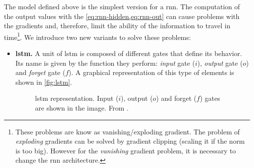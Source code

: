 The model defined above is the simplest version for a \gls{rnn}. The
computation of the output values with the \vref{eq:rnn-hidden,eq:rnn-out} can
cause problems with the gradients and, therefore, limit the ability of the
information to travel in time\footnote{These problems are know as
  vanishing/exploding gradient. The problem of \emph{exploding} gradients can
  be solved by gradient clipping (scaling it if the norm is too big). However
  for the \emph{vanishing} gradient problem, it is necessary to change the
  \gls{rnn} architecture.}. We introduce two new variants to solve these
problems:
\begin{itemize}
  \item \textbf{\gls{lstm}.} A unit of \gls{lstm} is composed of different
  gates that define its behavior. Its name is given by the function they
  perform: \emph{input} gate (\(i\)), \emph{output} gate (\(o\)) and
  \emph{forget} gate (\(f\)). A graphical representation of this type of
  elements is shown in \vref{fig:lstm}.
  \begin{figure}[ht]
    \centering
    
    \caption[ representation]{\acf{lstm}
      representation. Input (\(i\)), output (\(o\)) and forget (\(f\)) gates
      are shown in the image. From
      .}\label{fig:lstm}
  \end{figure}


\end{itemize}
